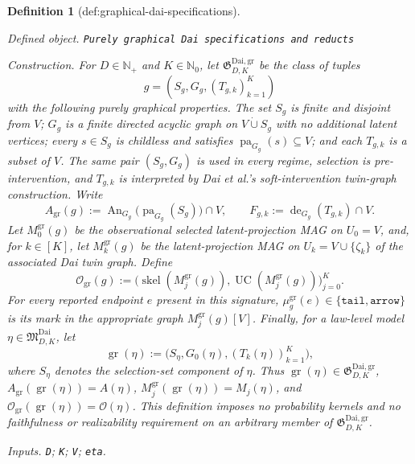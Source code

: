 \documentclass{article}
\newtheorem{definition}{Definition}
\begin{document}
\begin{definition}[def:graphical-dai-specifications]\label{def:graphical-dai-specifications}
\par\smallskip\noindent\emph{Defined object.} \texttt{Purely graphical Dai specifications and reducts}
\par\smallskip\noindent\emph{Construction.} For \(D\in\mathbb N_{+}\) and \(K\in\mathbb N_{0}\), let \(\mathfrak G_{D,K}^{\mathrm{Dai,gr}}\) be the class of tuples
\[
 g=(S_g,G_g,(T_{g,k})_{k=1}^{K})
\]
with the following purely graphical properties.  The set \(S_g\) is finite and disjoint from \(V\); \(G_g\) is a finite directed acyclic graph on \(V\mathbin{\dot\cup}S_g\) with no additional latent vertices; every \(s\in S_g\) is childless and satisfies \(\operatorname{pa}_{G_g}(s)\subseteq V\); and each \(T_{g,k}\) is a subset of \(V\).  The same pair \((S_g,G_g)\) is used in every regime, selection is pre-intervention, and \(T_{g,k}\) is interpreted by Dai et al.'s soft-intervention twin-graph construction.  Write
\[
 A_{\mathrm{gr}}(g)
 :=\operatorname{An}_{G_g}\!\bigl(\operatorname{pa}_{G_g}(S_g)\bigr)\cap V,
 \qquad
 F_{g,k}:=\operatorname{de}_{G_g}(T_{g,k})\cap V.
\]
Let \(M^{\mathrm{gr}}_0(g)\) be the observational selected latent-projection MAG on \(U_0=V\), and, for \(k\in[K]\), let \(M^{\mathrm{gr}}_k(g)\) be the latent-projection MAG on \(U_k=V\cup\{\zeta_k\}\) of the associated Dai twin graph.  Define
\[
 \mathcal O_{\mathrm{gr}}(g)
 :=\bigl(\operatorname{skel}(M^{\mathrm{gr}}_j(g)),
          \operatorname{UC}(M^{\mathrm{gr}}_j(g))\bigr)_{j=0}^{K}.
\]
For every reported endpoint \(e\) present in this signature, \(\mu^{\mathrm{gr}}_g(e)\in\{\mathtt{tail},\mathtt{arrow}\}\) is its mark in the appropriate graph \(M^{\mathrm{gr}}_j(g)[V]\).  Finally, for a law-level model \(\eta\in\mathfrak M_{D,K}^{\mathrm{Dai}}\), let
\[
 \operatorname{gr}(\eta)
 :=\bigl(S_\eta,G_0(\eta),(T_k(\eta))_{k=1}^{K}\bigr),
\]
where \(S_\eta\) denotes the selection-set component of \(\eta\).  Thus \(\operatorname{gr}(\eta)\in\mathfrak G_{D,K}^{\mathrm{Dai,gr}}\), \(A_{\mathrm{gr}}(\operatorname{gr}(\eta))=A(\eta)\), \(M_j^{\mathrm{gr}}(\operatorname{gr}(\eta))=M_j(\eta)\), and \(\mathcal O_{\mathrm{gr}}(\operatorname{gr}(\eta))=\mathcal O(\eta)\).  This definition imposes no probability kernels and no faithfulness or realizability requirement on an arbitrary member of \(\mathfrak G_{D,K}^{\mathrm{Dai,gr}}\).
\par\smallskip\noindent\emph{Inputs.} \texttt{D}; \texttt{K}; \texttt{V}; \texttt{eta}.
\end{definition}
\end{document}
